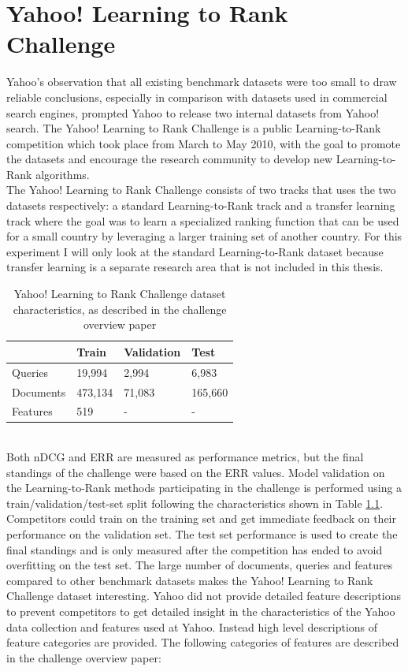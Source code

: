 \chapter{Yahoo! Learning to Rank Challenge}
Yahoo's observation that all existing benchmark datasets were too small to draw reliable conclusions, especially in comparison with datasets used in commercial search engines, prompted Yahoo to release two internal datasets from Yahoo! search. The Yahoo! Learning to Rank Challenge\cite{Chapelle2011a} is a public Learning-to-Rank competition which took place from March to May 2010, with the goal to promote the datasets and encourage the research community to develop new Learning-to-Rank algorithms.\\

The Yahoo! Learning to Rank Challenge consists of two tracks that uses the two datasets respectively: a standard Learning-to-Rank track and a transfer learning track where the goal was to learn a specialized ranking function that can be used for a small country by leveraging a larger training set of another country. For this experiment I will only look at the standard Learning-to-Rank dataset because transfer learning is a separate research area that is not included in this thesis.\\
\begin{table}[!h]
\begin{tabular}{l|lll}
 & Train & Validation & Test \\ 
 \hline
Queries & 19,994 & 2,994 & 6,983 \\ 
Documents & 473,134 & 71,083 & 165,660 \\ 
Features & 519 & - & - \\ 
\end{tabular}
\caption{Yahoo! Learning to Rank Challenge dataset characteristics, as described in the challenge overview paper\cite{Chapelle2011a}}
\label{tab:yahoo_characteristics}
\end{table}\\
Both \ac{nDCG} and \ac{ERR} are measured as performance metrics, but the final standings of the challenge were based on the \ac{ERR} values. Model validation on the Learning-to-Rank methods participating in the challenge is performed using a train/validation/test-set split following the characteristics shown in Table \ref{tab:yahoo_characteristics}. Competitors could train on the training set and get immediate feedback on their performance on the validation set. The test set performance is used to create the final standings and is only measured after the competition has ended to avoid overfitting on the test set. The large number of documents, queries and features compared to other benchmark datasets makes the Yahoo! Learning to Rank Challenge dataset interesting. Yahoo did not provide detailed feature descriptions to prevent competitors to get detailed insight in the characteristics of the Yahoo data collection and features used at Yahoo. Instead high level descriptions of feature categories are provided. The following categories of features are described in the challenge overview paper\cite{Chapelle2011a}:\\
